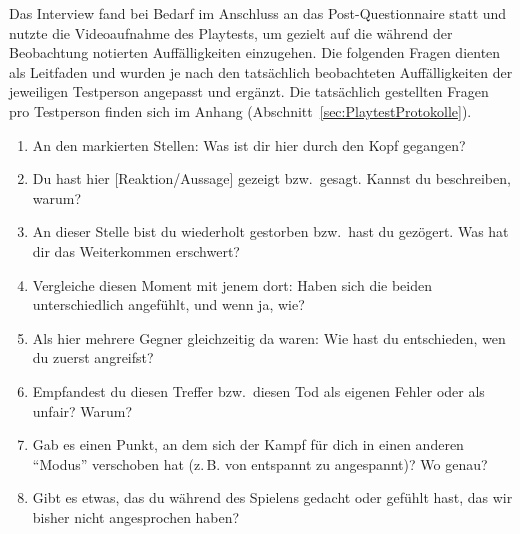 \documentclass[../Main.tex]{subfiles}
\begin{document}
Das Interview fand bei Bedarf im Anschluss an das Post-Questionnaire statt und nutzte die Videoaufnahme des Playtests, um gezielt auf die während der Beobachtung notierten Auffälligkeiten einzugehen. Die folgenden Fragen dienten als Leitfaden und wurden je nach den tatsächlich beobachteten Auffälligkeiten der jeweiligen Testperson angepasst und ergänzt. Die tatsächlich gestellten Fragen pro Testperson finden sich im Anhang (Abschnitt~\ref{sec:PlaytestProtokolle}).

\begin{enumerate}[label=\textbf{I\arabic*}, leftmargin=1.5cm, itemsep=0.5em]
    \item An den markierten Stellen: Was ist dir hier durch den Kopf gegangen?
    \item Du hast hier [Reaktion/Aussage] gezeigt bzw.\ gesagt. Kannst du beschreiben, warum?
    \item An dieser Stelle bist du wiederholt gestorben bzw.\ hast du gezögert. Was hat dir das Weiterkommen erschwert?
    \item Vergleiche diesen Moment mit jenem dort: Haben sich die beiden unterschiedlich angefühlt, und wenn ja, wie?
    \item Als hier mehrere Gegner gleichzeitig da waren: Wie hast du entschieden, wen du zuerst angreifst?
    \item Empfandest du diesen Treffer bzw.\ diesen Tod als eigenen Fehler oder als unfair? Warum?
    \item Gab es einen Punkt, an dem sich der Kampf für dich in einen anderen \enquote{Modus} verschoben hat (z.\,B. von entspannt zu angespannt)? Wo genau?
    \item Gibt es etwas, das du während des Spielens gedacht oder gefühlt hast, das wir bisher nicht angesprochen haben?
\end{enumerate}
\end{document}
